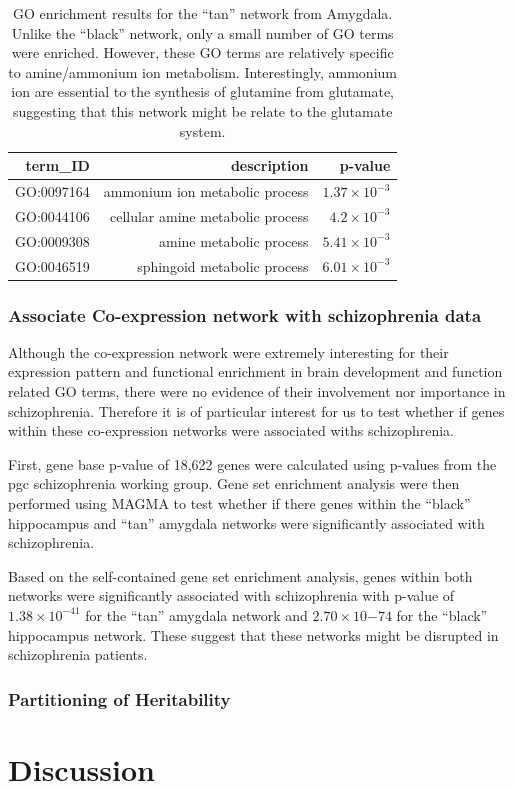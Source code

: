 \begin{table}[h]
	\centering
	\caption[ enrichment results for the ``tan'' network from Amygdala]{\gls{GO} enrichment results for the ``tan'' network from Amygdala.
		Unlike the ``black'' network, only a small number of \gls{GO} terms were enriched. 
		However, these \gls{GO} terms are relatively specific to amine/ammonium ion metabolism.
		Interestingly, ammonium ion are essential to the synthesis of glutamine from glutamate, suggesting that this network might be relate to the glutamate system.
	}
	\begin{tabular}{rrr}
		\toprule
		term\_ID & description & p-value \\
		\midrule
		GO:0097164 & ammonium ion metabolic process & $1.37\times 10^{-3}$ \\
		GO:0044106 & cellular amine metabolic process & $4.2\times 10^{-3}$ \\
		GO:0009308 & amine metabolic process & $5.41\times 10^{-3}$ \\
		GO:0046519 & sphingoid metabolic process & $6.01\times 10^{-3}$ \\
		\bottomrule
	\end{tabular}%
	\label{tab:tanGO}%
\end{table}%

\subsubsection{Associate Co-expression network with  schizophrenia data}
Although the co-expression network were extremely interesting for their expression pattern and functional enrichment in brain development and function related \gls{GO} terms, there were no evidence of their involvement nor importance in schizophrenia.
Therefore it is of particular interest for us to test whether if genes within these co-expression networks were associated withs schizophrenia. 

First, gene base p-value of 18,622 genes were calculated using p-values from the \gls{pgc} schizophrenia working group\citep{Ripke2014}.
Gene set enrichment analysis were then performed using \gls{MAGMA}\citep{DeLeeuw2015} to test whether if there genes within the ``black'' hippocampus and ``tan'' amygdala networks were significantly associated with schizophrenia.

Based on the self-contained gene set enrichment analysis, genes within both networks were significantly associated with schizophrenia with p-value of $1.38\times 10^{-41}$ for the ``tan'' amygdala network and $2.70\times 10{-74}$ for the ``black'' hippocampus network.
These suggest that these networks might be disrupted in schizophrenia patients.




\subsubsection{Partitioning of Heritability}

\section{Discussion}